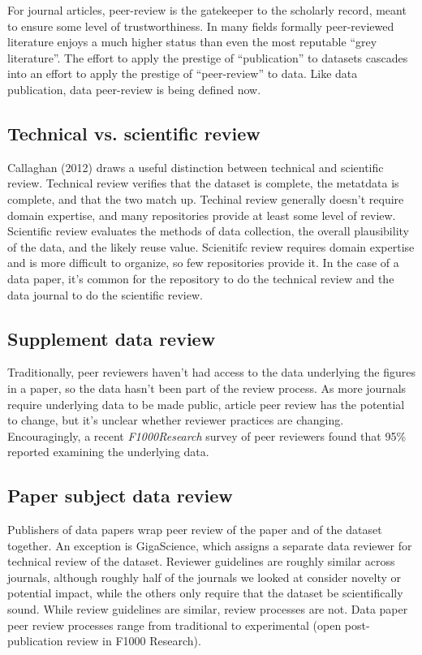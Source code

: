 \documentclass[10pt,a4paper,twocolumn]{article}
\begin{document}
For journal articles, peer-review is the gatekeeper to the scholarly record, meant to ensure some level of trustworthiness.
In many fields formally peer-reviewed literature enjoys a much higher status than even the most reputable ``grey literature''.
The effort to apply the prestige of ``publication'' to datasets cascades into an effort to apply the prestige of ``peer-review'' to data.
Like data publication, data peer-review is being defined now.

\subsection*{Technical vs. scientific review}
Callaghan (2012)\cite{callaghan_making_2012} draws a useful distinction between technical and scientific review. 
Technical review verifies that the dataset is complete, the metatdata is complete, and that the two match up.  
Techinal review generally doesn't require domain expertise, and many repositories provide at least some level of review. 
Scientific review evaluates the methods of data collection, the overall plausibility of the data, and the likely reuse value. 
Scienitifc review requires domain expertise and is more difficult to organize, so few repositories provide it.
In the case of a data paper, it's common for the repository to do the technical review and the data journal to do the scientific review.

\subsection*{Supplement data review}
Traditionally, peer reviewers haven't had access to the data underlying the figures in a paper, so the data hasn't been part of the review process.
As more journals require underlying data to be made public, article peer review has the potential to change, but it's unclear whether reviewer practices are changing.
Encouragingly, a recent \emph{F1000Research} survey of peer reviewers found that 95\% reported examining the underlying data.

\subsection*{Paper subject data review}
Publishers of data papers wrap peer review of the paper and of the dataset together. 
An exception is GigaScience\cite{gigascience}, which assigns a separate data reviewer for technical review of the dataset. 
Reviewer guidelines are roughly similar across journals, although roughly half of the journals we looked at consider novelty or potential impact, while the others only require that the dataset be scientifically sound.
While review guidelines are similar, review processes are not. 
Data paper peer review processes range from traditional to experimental (open post-publication review in F1000 Research).
\end{document}
